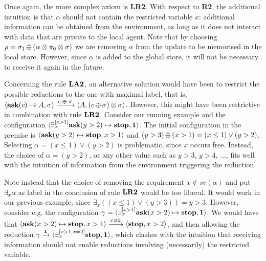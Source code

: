 \documentclass{llncs}
\def\1{{\mathbf 1}}
\newcommand{\ask}{{\bf ask}}
\newcommand{\ostop}{{\bf stop}}
\def\monid{{\mathbf 0}}
\def\1{{\mathbf 1}}
\def\odiv{\, {\ominus\hspace{-7.7pt} \div} \,}
\def\monid{\mathbf{1}}
\begin{document}
Once again, the more complex axiom is {\bf LR2}. With respect to {\bf R2}, the additional intuition is that 
$\alpha$ should not contain the restricted variable $x$: additional information can be obtained from the environment,
as long as it does not interact with data that are private to the local agent.
%
Note that by choosing $\rho = \sigma_1 \odiv (\alpha \otimes \pi_0  \otimes \sigma)$ we are 
removing $\alpha$ from the update to be memorised in the local store. However, 
since $\alpha$ is added to the global store, it will not be necessary to receive it again in the future. 


\def\ooodiv{\; {\ominus\hspace{-5.7pt} \div} \;}

\begin{remark}
Concerning the rule ${\bf LA2}$, 
%
an alternative solution %
would have been to restrict the possible reductions to the one with maximal label, 
that is, $\langle \hbox{\ask}(c) \mapsto A, \sigma \rangle \xrightarrow{c \ooodiv \sigma} \langle A, (c \odiv \sigma) \otimes \sigma \rangle$. 
However, this might have been restrictive in combination with rule ${\bf LR2}$.
Consider  our running example and the configuration 
$\langle \exists^{[x > 1]}_x \hbox{\ask}(y > 2) \mapsto \hbox{\ostop}, \monid \rangle$. The initial configuration in the premise is
$\langle \hbox{\ask}(y > 2) \mapsto \hbox{\ostop}, x > 1 \rangle$ and $(y > 3) \odiv (x > 1) = (x \leq 1) \vee (y > 2)$.
Selecting $\alpha = (x \leq 1) \vee (y > 2)$ is problematic, since $x$ occurs free. Instead, the choice of $\alpha = (y > 2)$,
or any other value such as $y > 3$, $y > 4$, $\ldots$, fits well with the intuition of information  from the environment 
triggering the reduction.

Note instead that the choice of removing the requirement $x \not \in sv(\alpha)$ and put $\exists_x \alpha$ as label in the 
conclusion of rule ${\bf LR2}$ would  be too liberal. It would work in our previous example, since 
$\exists_x((x \leq 1) \vee (y > 3)) = y > 3$. However, consider e.g. 
the configuration $\gamma = \langle \exists^{[x > 1]}_x \hbox{\ask}(x > 2) \mapsto \hbox{\ostop}, \monid \rangle$. 
We would have that 
$\langle \hbox{\ask}(x > 2) \mapsto \hbox{\ostop}, x > 1 \rangle \xrightarrow{x \neq 2} \langle \hbox{\ostop}, x > 2 \rangle$,
and then allowing the reduction $\gamma \xrightarrow{\monid} \langle \exists^{[x > 1, x \neq 2]}_x \hbox{\ostop}, \monid \rangle$,
which clashes with the intuition that receiving information should not enable reductions involving (necessarily) 
the restricted variable.
\end{remark}
\end{document}
